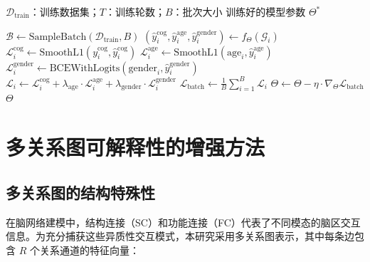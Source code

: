 \begin{algorithm}
  \centering
  \caption{对抗去偏训练流程}
  \label{alg:adversarial_training}
  \small
  \begin{algorithmic}[1]
  \REQUIRE $\mathcal{D}_{\text{train}}$：训练数据集；$T$：训练轮数；$B$：批次大小
  \ENSURE 训练好的模型参数 $\Theta^*$

  \STATE {}
    \STATE {}
    \STATE $\mathcal{B} \leftarrow \text{SampleBatch}(\mathcal{D}_{\text{train}}, B)$
    \STATE {}
      \STATE $(\hat{y}_i^{\text{cog}}, \hat{y}_i^{\text{age}}, \hat{y}_i^{\text{gender}}) \leftarrow f_{\Theta}(\mathcal{G}_i)$
      \STATE {}
      \STATE $\mathcal{L}_i^{\text{cog}} \leftarrow \text{SmoothL1}(y_i^{\text{cog}}, \hat{y}_i^{\text{cog}})$
      \STATE {}
      \STATE $\mathcal{L}_i^{\text{age}} \leftarrow \text{SmoothL1}(\text{age}_i, \hat{y}_i^{\text{age}})$
      \STATE $\mathcal{L}_i^{\text{gender}} \leftarrow \text{BCEWithLogits}(\text{gender}_i, \hat{y}_i^{\text{gender}})$
      \STATE {}
      \STATE $\mathcal{L}_i \leftarrow \mathcal{L}_i^{\text{cog}} + \lambda_{\text{age}} \cdot \mathcal{L}_i^{\text{age}} + \lambda_{\text{gender}} \cdot \mathcal{L}_i^{\text{gender}}$
    \ENDFOR
    \STATE {}
    \STATE $\mathcal{L}_{\text{batch}} \leftarrow \frac{1}{B} \sum_{i=1}^{B} \mathcal{L}_i$
    \STATE {}
    \STATE $\Theta \leftarrow \Theta - \eta \cdot \nabla_{\Theta} \mathcal{L}_{\text{batch}}$
  \ENDFOR
  \RETURN $\Theta$
  \end{algorithmic}
\end{algorithm}

\newpage

\section{多关系图可解释性的增强方法}

\subsection{多关系图的结构特殊性}

在脑网络建模中，结构连接（SC）和功能连接（FC）代表了不同模态的脑区交互信息。为充分捕获这些异质性交互模式，本研究采用多关系图表示，其中每条边包含 $R$ 个关系通道的特征向量：

